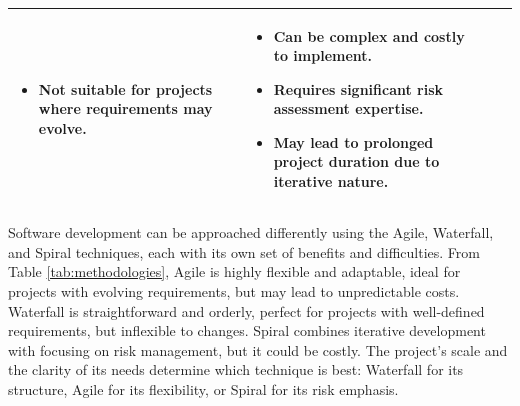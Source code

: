 \begin{table}[htbp]
\begin{tabularx}{\textwidth}{>{\bfseries}lXXX}
\begin{itemize}
        \item Not suitable for projects where requirements may evolve.
    \end{itemize} & 
    \begin{itemize}
        \item Can be complex and costly to implement.
        \item Requires significant risk assessment expertise.
        \item May lead to prolonged project duration due to iterative nature.
    \end{itemize} \\
    \bottomrule
    \end{tabularx}
\end{table}    
Software development can be approached differently using the Agile, Waterfall, and Spiral techniques, each with its own set of benefits and difficulties.
From Table \ref{tab:methodologies}, Agile is highly flexible and adaptable, ideal for projects with evolving requirements, but may lead to unpredictable costs.
Waterfall is straightforward and orderly, perfect for projects with well-defined requirements, but inflexible to changes.
Spiral combines iterative development with focusing on risk management, but it could be costly. 
The project's scale and the clarity of its needs determine which technique is best: Waterfall for its structure, Agile for its flexibility, or Spiral for its risk emphasis.


